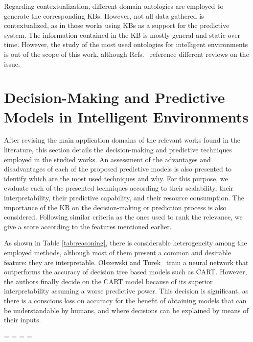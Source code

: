 Regarding contextualization, different domain ontologies are employed to generate the corresponding KBs. However, not all data gathered is contextualized, as in those works using KBs as a support for the predictive system. The information contained in the KB is mostly general and static over time. However, the study of the most used ontologies for intelligent environments is out of the scope of this work, although Refs.~\citep{Preuveneers2004TowardsAE, ontologiessmartcities,reviewontiot} reference different reviews on the issue.

\section{Decision-Making and Predictive Models in Intelligent Environments \label{sec:reasoning}}
After revising the main application domains of the relevant works found in the literature, this section details the decision-making and predictive techniques employed in the studied works.  An assessment of the advantages and disadvantages of each of the proposed predictive models is also presented to identify which are the most used techniques and why. For this purpose, we evaluate each of the presented techniques according to their scalability, their interpretability, their predictive capability, and their resource consumption. The importance of the KB on the decision-making or prediction process is also considered. Following similar criteria as the ones used to rank the relevance, we give a score according to the features mentioned earlier.   

As shown in Table \ref{tab:reasoning}, there is considerable heterogeneity among the employed methods, although most of them present a common and desirable feature: they are interpretable.  Olszewski and Turek~\citep{olszewskiturek} train a neural network that outperforms the accuracy of decision tree based models such as CART. However, the authors finally decide on the CART model because of its superior interpretability assuming a worse predictive power. This decision is significant, as there is a conscious loss on accuracy for the benefit of obtaining models that can be understandable by humans, and where decisions can be explained by means of their inputs.


\newpage
\paperwidth=\pdfpageheight
\paperheight=\pdfpagewidth
\pdfpageheight=\paperheight
\pdfpagewidth=\paperwidth
\fancyheadoffset[LO,RE]{0cm}
\fancyheadoffset[RO,LE]{0cm}

